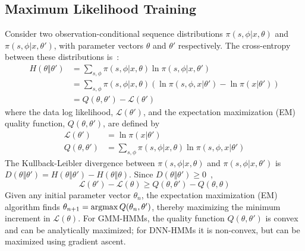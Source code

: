 \subsection{Maximum Likelihood Training}

Consider two observation-conditional sequence distributions
$\pi(s,\phi|x,\theta)$ and $\pi(s,\phi|x,\theta')$, with parameter
vectors $\theta$ and $\theta'$ respectively.  The cross-entropy
between these distributions is~\cite{Dempster77}:
\begin{align}
  H\left(\theta\Vert\theta'\right) &=
  \sum_{s,\phi} \pi(s,\phi|x,\theta)
  \ln \pi(s,\phi|x,\theta')\\
  &=   \sum_{s,\phi} \pi(s,\phi|x,\theta)
  \left(\ln \pi(s,\phi,x|\theta')-\ln \pi(x|\theta')\right)\\
  &=  Q\left(\theta,\theta'\right)-{\mathcal L}\left(\theta'\right)
  \label{eq:crossentropy}
\end{align}
where the data log likelihood, ${\mathcal L}\left(\theta'\right)$, and
the expectation maximization (EM) quality function,
$Q\left(\theta,\theta'\right)$, are defined by
\begin{align}
  {\mathcal L}\left(\theta'\right) &= \ln \pi(x|\theta')
  \label{eq:loglikelihood}\\
  Q\left(\theta,\theta'\right)
  &=
  \sum_{s,\phi} \pi(s,\phi|x,\theta)\ln \pi(s,\phi,x|\theta')
   \label{eq:Qfunction}
\end{align}
The Kullback-Leibler divergence between $\pi(s,\phi|x,\theta)$ and
$\pi(s,\phi|x,\theta')$ is $D\left(\theta\Vert\theta'\right)=
H\left(\theta\Vert\theta'\right)-H\left(\theta\Vert\theta\right)$.
Since $D\left(\theta\Vert\theta'\right)\ge 0$~\cite{Shannon49},
\begin{equation}
  {\mathcal L}\left(\theta'\right)-{\mathcal L}\left(\theta\right)\ge
  Q\left(\theta,\theta'\right)-
  Q\left(\theta,\theta\right)
  \label{eq:LgeQ}
\end{equation}
Given any initial parameter vector $\theta_n$, the expectation
maximization (EM) algorithm finds $\theta_{n+1}=\operatorname*{argmax}
Q(\theta_n,\theta')$, thereby maximizing the minimum increment in
${\mathcal L}(\theta)$.  For GMM-HMMs, the quality function
$Q\left(\theta,\theta'\right)$ is convex and can be analytically
maximized; for DNN-HMMs it is non-convex, but can be maximized using
gradient ascent.

